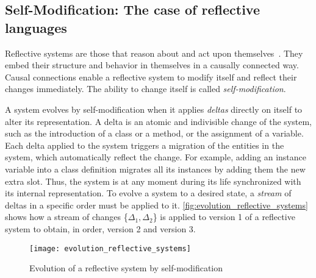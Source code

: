 

\subsection{Self-Modification: The case of reflective languages}


Reflective systems are those that reason about and act upon themselves~\cite{Smit84a}.
They embed their structure and behavior in themselves in a causally connected way.
Causal connections enable a reflective system to modify itself and reflect their changes immediately.
The ability to change itself is called \emph{self-modification}.

A system evolves by self-modification when it applies \emph{deltas} directly on itself to alter its representation. 
A delta is an atomic and indivisible change of the system, such as the introduction of a class or a method, or the assignment of a variable.
Each delta applied to the system triggers a migration of the entities in the system, which automatically reflect the change.
For example, adding an instance variable into a class definition migrates all its instances by adding them the new extra slot.
Thus, the system is at any moment during its life synchronized with its internal representation.
To evolve a system to a desired state, a \emph{stream} of deltas in a specific order must be applied to it.
\autoref{fig:evolution_reflective_systems} shows how a stream of changes \{$\Delta_1, \Delta_2$\} is applied to version 1 of a reflective system to obtain, in order, version 2 and version 3.

\begin{figure}[!ht]
\begin{center}
\texttt{[image: evolution\_reflective\_systems]}
\caption{Evolution of a reflective system by self-modification\label{fig:evolution_reflective_systems}}
\end{center}
\end{figure}


